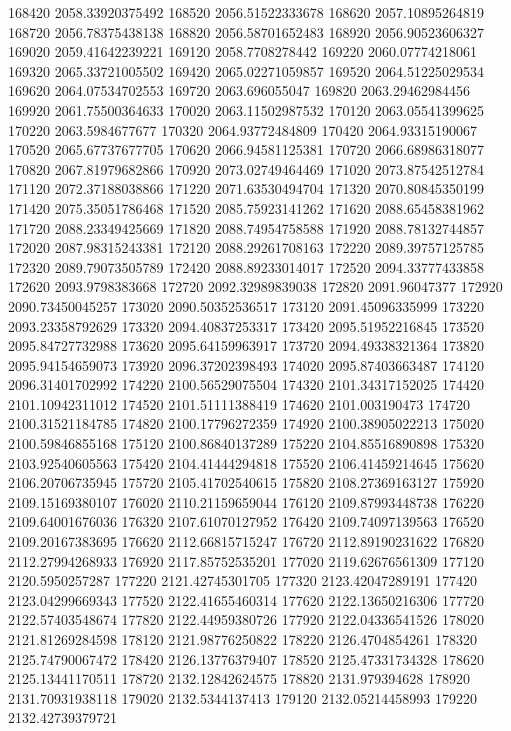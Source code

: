 {168420 2058.33920375492
168520 2056.51522333678
168620 2057.10895264819
168720 2056.78375438138
168820 2056.58701652483
168920 2056.90523606327
169020 2059.41642239221
169120 2058.7708278442
169220 2060.07774218061
169320 2065.33721005502
169420 2065.02271059857
169520 2064.51225029534
169620 2064.07534702553
169720 2063.696055047
169820 2063.29462984456
169920 2061.75500364633
170020 2063.11502987532
170120 2063.05541399625
170220 2063.5984677677
170320 2064.93772484809
170420 2064.93315190067
170520 2065.67737677705
170620 2066.94581125381
170720 2066.68986318077
170820 2067.81979682866
170920 2073.02749464469
171020 2073.87542512784
171120 2072.37188038866
171220 2071.63530494704
171320 2070.80845350199
171420 2075.35051786468
171520 2085.75923141262
171620 2088.65458381962
171720 2088.23349425669
171820 2088.74954758588
171920 2088.78132744857
172020 2087.98315243381
172120 2088.29261708163
172220 2089.39757125785
172320 2089.79073505789
172420 2088.89233014017
172520 2094.33777433858
172620 2093.9798383668
172720 2092.32989839038
172820 2091.96047377
172920 2090.73450045257
173020 2090.50352536517
173120 2091.45096335999
173220 2093.23358792629
173320 2094.40837253317
173420 2095.51952216845
173520 2095.84727732988
173620 2095.64159963917
173720 2094.49338321364
173820 2095.94154659073
173920 2096.37202398493
174020 2095.87403663487
174120 2096.31401702992
174220 2100.56529075504
174320 2101.34317152025
174420 2101.10942311012
174520 2101.51111388419
174620 2101.003190473
174720 2100.31521184785
174820 2100.17796272359
174920 2100.38905022213
175020 2100.59846855168
175120 2100.86840137289
175220 2104.85516890898
175320 2103.92540605563
175420 2104.41444294818
175520 2106.41459214645
175620 2106.20706735945
175720 2105.41702540615
175820 2108.27369163127
175920 2109.15169380107
176020 2110.21159659044
176120 2109.87993448738
176220 2109.64001676036
176320 2107.61070127952
176420 2109.74097139563
176520 2109.20167383695
176620 2112.66815715247
176720 2112.89190231622
176820 2112.27994268933
176920 2117.85752535201
177020 2119.62676561309
177120 2120.5950257287
177220 2121.42745301705
177320 2123.42047289191
177420 2123.04299669343
177520 2122.41655460314
177620 2122.13650216306
177720 2122.57403548674
177820 2122.44959380726
177920 2122.04336541526
178020 2121.81269284598
178120 2121.98776250822
178220 2126.4704854261
178320 2125.74790067472
178420 2126.13776379407
178520 2125.47331734328
178620 2125.13441170511
178720 2132.12842624575
178820 2131.979394628
178920 2131.70931938118
179020 2132.5344137413
179120 2132.05214458993
179220 2132.42739379721
}
